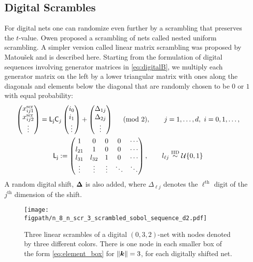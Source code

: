 \documentclass{svproc}
\newcommand{\figpath}{Figures}
\begin{document}
\subsection{Digital Scrambles} \label{sec:scrambles}
For digital nets one can randomize even further by a scrambling that preserves the $t$-value.  Owen \cite{Owe95} proposed a scrambling of nets called nested uniform scrambling.  A simpler version called linear matrix scrambling was proposed by Matou\v{s}ek \cite{Mat98} and is described here.  Starting from the formulation of digital sequences involving generator matrices in \eqref{eq:digitalB}, we multiply each generator matrix on the left by a lower triangular matrix with ones along the diagonals and elements below the diagonal that are randomly chosen to be $0$ or $1$ with equal probability:
\begin{subequations} \label{eq:scr_lattice}
\begin{gather} \label{eq:digitalscr}
	\begin{pmatrix} x^{\text{scr}}_{ij1} \\ x^{\text{scr}}_{ij2} \\ \vdots \end{pmatrix}
	= \mathsf{L_j} \mathsf{C}_j \begin{pmatrix} i_0 \\ i_1 \\ \vdots \end{pmatrix} + \begin{pmatrix} \Delta_{1j} \\ \Delta_{2j} \\ \vdots \end{pmatrix} \quad \pmod{2}, \qquad j = 1,\ldots, d, \ i = 0, 1, \ldots, \\
	\mathsf{L_j} :=
	\begin{pmatrix}
		1 & 0 & 0 & 0 & \cdots \\
		l_{21} & 1 & 0 & 0 & \cdots \\
		l_{31} & l_{32} & 1 & 0 & \cdots \\
		\vdots & \vdots & \vdots & \ddots & \ddots
	\end{pmatrix}, \qquad l_{\ell j} \overset {\text{IID}}{\sim} {\mathcal{U}}\{0,1\}
\end{gather}
\end{subequations}
A random digital shift, ${\boldsymbol{\Delta}}$ is also added, where $\Delta_{\ell j}$ denotes the $\ell^{\text{th}}$ digit of the $j^{\text{th}}$ dimension of the shift.

\begin{figure}
	\centering
	\texttt{[image: \\figpath/n\_8\_n\_scr\_3\_scrambled\_sobol\_sequence\_d2.pdf]}
	\caption{Three linear scrambles of a digital $(0,3,2)$-net with nodes denoted by three different colors.  There is one node in each smaller box of the form \eqref{eq:element_box} for $\lVert {\boldsymbol{k}} \rVert = 3$, for each digitally shifted net. \label{fig:scrambled_net}}
\end{figure}
\end{document}
